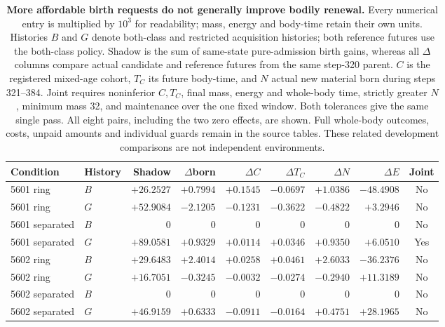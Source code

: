 \begin{table}[!htbp]
\centering
\footnotesize
\setlength{\tabcolsep}{3pt}
\begin{tabular}{llrrrrrrc}
\toprule
Condition & History & Shadow & $\Delta$born & $\Delta C$ & $\Delta T_C$ & $\Delta N$ & $\Delta E$ & Joint \\
\midrule
5601 ring & $B$ & $+26.2527$ & $+0.7994$ & $+0.1545$ & $-0.0697$ & $+1.0386$ & $-48.4908$ & No \\
5601 ring & $G$ & $+52.9084$ & $-2.1205$ & $-0.1231$ & $-0.3622$ & $-0.4822$ & $+3.2946$ & No \\
5601 separated & $B$ & $0$ & $0$ & $0$ & $0$ & $0$ & $0$ & No \\
5601 separated & $G$ & $+89.0581$ & $+0.9329$ & $+0.0114$ & $+0.0346$ & $+0.9350$ & $+6.0510$ & Yes \\
5602 ring & $B$ & $+29.6483$ & $+2.4014$ & $+0.0258$ & $+0.0461$ & $+2.6033$ & $-36.2376$ & No \\
5602 ring & $G$ & $+16.7051$ & $-0.3245$ & $-0.0032$ & $-0.0274$ & $-0.2940$ & $+11.3189$ & No \\
5602 separated & $B$ & $0$ & $0$ & $0$ & $0$ & $0$ & $0$ & No \\
5602 separated & $G$ & $+46.9159$ & $+0.6333$ & $-0.0911$ & $-0.0164$ & $+0.4751$ & $+28.1965$ & No \\
\bottomrule
\end{tabular}
\caption{\textbf{More affordable birth requests do not generally improve bodily renewal.} Every numerical entry is multiplied by $10^3$ for readability; mass, energy and body-time retain their own units. Histories $B$ and $G$ denote both-class and restricted acquisition histories; both reference futures use the both-class policy. Shadow is the sum of same-state pure-admission birth gains, whereas all $\Delta$ columns compare actual candidate and reference futures from the same step-320 parent. $C$ is the registered mixed-age cohort, $T_C$ its future body-time, and $N$ actual new material born during steps 321--384. Joint requires noninferior $C,T_C$, final mass, energy and whole-body time, strictly greater $N$, minimum mass 32, and maintenance over the one fixed window. Both tolerances give the same single pass. All eight pairs, including the two zero effects, are shown. Full whole-body outcomes, costs, unpaid amounts and individual guards remain in the source tables. These related development comparisons are not independent environments.}
\label{tab:conversion-birth-branch}
\end{table}
